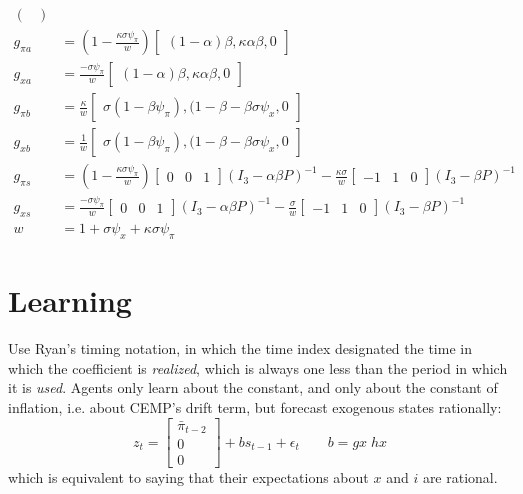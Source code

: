 \documentclass[11pt]{article}
\renewcommand{\[}{\begin{equation}}
\renewcommand{\]}{\end{equation}}
\begin{document}
\begin{align}
\begin{pmatrix}
\end{pmatrix} \\
g_{\pi a} & =(1-\frac{\kappa\sigma\psi_{\pi}}{w} )  \begin{bmatrix}(1-\alpha)\beta, \kappa\alpha\beta, 0 \end{bmatrix} \\
g_{x a} & =  \frac{-\sigma\psi_{\pi}}{w} \begin{bmatrix}(1-\alpha)\beta, \kappa\alpha\beta, 0 \end{bmatrix}\\
g_{\pi b} & = \frac{\kappa}{w} \begin{bmatrix}\sigma(1-\beta\psi_{\pi}), (1-\beta-\beta\sigma\psi_x, 0 \end{bmatrix}\\
g_{x b} & = \frac{1}{w} \begin{bmatrix}\sigma(1-\beta\psi_{\pi}), (1-\beta-\beta\sigma\psi_x, 0 \end{bmatrix} \\
g_{\pi s} & = (1-\frac{\kappa\sigma\psi_{\pi}}{w} )\begin{bmatrix} 0&0&1 \end{bmatrix} (I_3 - \alpha\beta P)^{-1} -\frac{\kappa\sigma}{w}\begin{bmatrix} -1&1&0 \end{bmatrix} (I_3 -\beta P)^{-1}\\
g_{x s} & =  \frac{-\sigma\psi_{\pi}}{w} \begin{bmatrix} 0&0&1 \end{bmatrix}(I_3 - \alpha\beta P)^{-1}  -\frac{\sigma}{w}\begin{bmatrix} -1&1&0 \end{bmatrix}(I_3 -\beta P)^{-1}\\
w & = 1+\sigma\psi_x +\kappa\sigma\psi_{\pi}
\end{align}
\clearpage

 \section{Learning}

Use Ryan's timing notation, in which the time index designated the time in which the coefficient is \emph{realized}, which is always one less than the period in which it is \emph{used}. Agents only learn about the constant, and only about the constant of inflation, i.e. about CEMP's drift term, but forecast exogenous states rationally:
\begin{equation}
z_t = \begin{bmatrix}\bar{\pi}_{t-2} \\ 0 \\
 0 \end{bmatrix}
+ bs_{t-1} + \epsilon_t \quad \quad b = gx \; hx\label{PLM_constant}  
\end{equation}
which is equivalent to saying that their expectations about $x$ and $i$ are rational.
\end{document}
